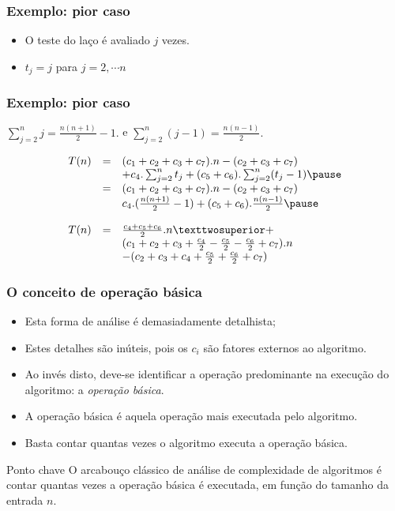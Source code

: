 \documentclass[handout]{beamer}
\begin{document}
\begin{frame}

\frametitle{Exemplo: pior caso}

  

  \begin{itemize}
    \item O teste do laço é avaliado $j$ vezes.
    \item $t_j = j$ para $j = 2, \cdots n$
  \end{itemize}

\end{frame}

\begin{frame}

\frametitle{Exemplo: pior caso}

$\sum_{j=2}^{n} j = \frac{n(n+1)}{2} - 1.$
e
$\sum_{j=2}^{n} (j-1) = \frac{n(n-1)}{2}.$

  $$
  \begin{array}{rcl}
    T(n) & = & (c_1+c_2+c_3+c_7).n  - (c_2 + c_3 + c_7) \\
    & & + c_4.\sum_{j=2}^{n} t_j+ (c_5+c_6).\sum_{j=2}^{n} (t_j-1) \pause \\
    & = & (c_1+c_2+c_3+c_7).n - (c_2 + c_3 + c_7) \\
    & & c_4.(\frac{n(n+1)}{2} - 1) + (c_5+c_6).\frac{n(n-1)}{2} \pause \\
    \\
    T(n)
    & = & \frac{c_4+c_5+c_6}{2}.n² + \\
    & &   (c_1+c_2+c_3+\frac{c_4}{2}-\frac{c_5}{2}-\frac{c_6}{2} + c_7).n \\
    & & - (c_2 + c_3 + c_4 + \frac{c_5}{2} + \frac{c_6}{2} + c_7)
  \end{array}
  $$

\end{frame}

\begin{frame}
\frametitle{O conceito de operação básica}

\begin{itemize}
\item Esta forma de análise é demasiadamente detalhista;
\item Estes detalhes são inúteis, pois os $c_i$ são fatores externos ao
  algoritmo.
\item Ao invés disto, deve-se identificar a operação predominante na execução
  do algoritmo: a \emph{operação básica}.
\item A operação básica é aquela operação mais executada pelo algoritmo.
\item Basta contar quantas vezes o algoritmo executa a operação básica.
\end{itemize}
\begin{block}{Ponto chave}
O arcabouço clássico de análise de complexidade de algoritmos é contar quantas vezes a operação básica é executada, em função do tamanho da entrada $n$.
\end{block}
\end{frame}
\end{document}
